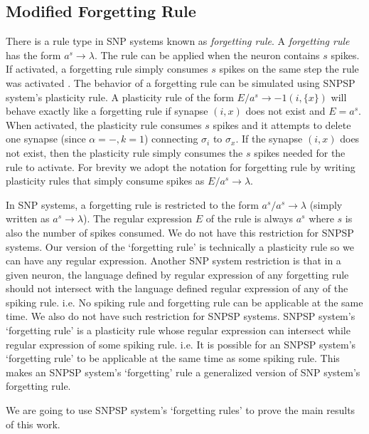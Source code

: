 \documentclass[smallextended]{svjour3}
\begin{document}

\subsection{Modified Forgetting Rule} \label{sec-forget}

There is a rule type in SNP systems known as \textit{forgetting rule}. A \textit{forgetting rule} has the form $a^s \rightarrow \lambda$. The rule
can be applied when the neuron contains $s$ spikes. If activated, a forgetting rule simply consumes $s$ spikes on the same step the rule was activated
. The behavior of a forgetting rule can be simulated using SNPSP system's plasticity rule. A plasticity rule of the form $E/a^s \rightarrow 
-1(i,\{x\})$ will behave exactly like a forgetting rule if synapse $(i,x)$ does not exist and $E=a^s$. When activated, the plasticity rule consumes 
$s$ spikes and it attempts to delete one synapse (since $\alpha = -, k=1$) connecting $\sigma_i$ to $\sigma_x$. If the synapse $(i,x)$ does not exist, 
then the plasticity rule simply consumes the $s$ spikes needed for the rule to activate. For brevity we adopt the notation for forgetting rule by
writing plasticity rules that simply consume spikes as $E/a^s \rightarrow \lambda$. 

In SNP systems, a forgetting rule is restricted to the form $a^s/a^s \rightarrow \lambda$ (simply written as $a^s \rightarrow \lambda$). The regular
expression $E$ of the rule is always $a^s$ where $s$ is also the number of spikes consumed. We do not have this restriction for SNPSP systems. Our 
version of the `forgetting rule' is technically a plasticity rule so we can have any regular expression. Another SNP system restriction is that in a 
given neuron, the language defined by regular expression of any forgetting rule should not intersect with the language defined regular expression of 
any of the spiking rule. i.e. No spiking rule and forgetting rule can be applicable at the same time. We also do not have such restriction for SNPSP
systems. SNPSP system's `forgetting rule' is a plasticity rule whose regular expression can intersect while regular expression of some spiking rule.
i.e. It is possible for an SNPSP system's `forgetting rule' to be applicable at the same time as some spiking rule. This makes an SNPSP system's 
`forgetting' rule a generalized version of SNP system's forgetting rule.

We are going to use SNPSP system's `forgetting rules' to prove the main results of this work.
\end{document}
